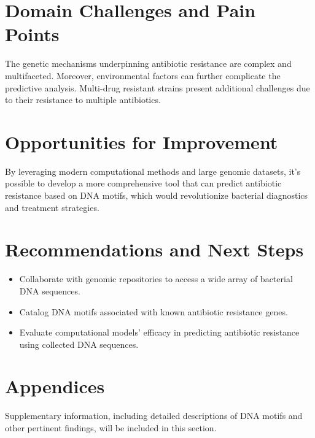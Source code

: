 \documentclass[12pt]{article}
\begin{document}
\section{Domain Challenges and Pain Points}
The genetic mechanisms underpinning antibiotic resistance are complex and multifaceted. Moreover, environmental factors can further complicate the predictive analysis. Multi-drug resistant strains present additional challenges due to their resistance to multiple antibiotics.

\section{Opportunities for Improvement}
By leveraging modern computational methods and large genomic datasets, it's possible to develop a more comprehensive tool that can predict antibiotic resistance based on DNA motifs, which would revolutionize bacterial diagnostics and treatment strategies.

\section{Recommendations and Next Steps}
\begin{itemize}
    \item Collaborate with genomic repositories to access a wide array of bacterial DNA sequences.
    \item Catalog DNA motifs associated with known antibiotic resistance genes.
    \item Evaluate computational models' efficacy in predicting antibiotic resistance using collected DNA sequences.
\end{itemize}

\section{Appendices}
Supplementary information, including detailed descriptions of DNA motifs and other pertinent findings, will be included in this section.
\end{document}
